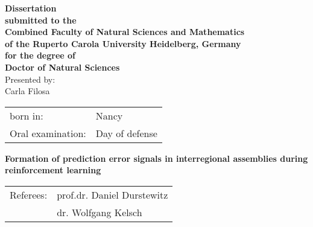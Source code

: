 \thispagestyle{plain}

\vspace*{1cm}

\begin{center}
\begin{large}
{\textbf{Dissertation\\submitted to the\\Combined Faculty of Natural Sciences and Mathematics\\of the Ruperto Carola University Heidelberg, Germany\\for the degree of\\Doctor of Natural Sciences}}\\
\vspace{10cm}
Presented by:\\ Carla Filosa\\
\vspace{1cm}
\begin{tabular}{ll}
born in: & Nancy \\
Oral examination: &  Day of defense \\
\end{tabular}
\end{large}
\end{center}
\afterpage{\blankpage}
\clearpage
\thispagestyle{plain}

\begin{center}
\begin{large}
\vspace*{3cm}
{\Huge \textbf{Formation of prediction error signals in interregional assemblies during reinforcement learning}}

\vspace*{10cm}

\begin{tabular}{ll}
Referees: & prof.dr. Daniel Durstewitz \\
&  dr. Wolfgang Kelsch \\
\end{tabular}
\end{large}
\end{center}




